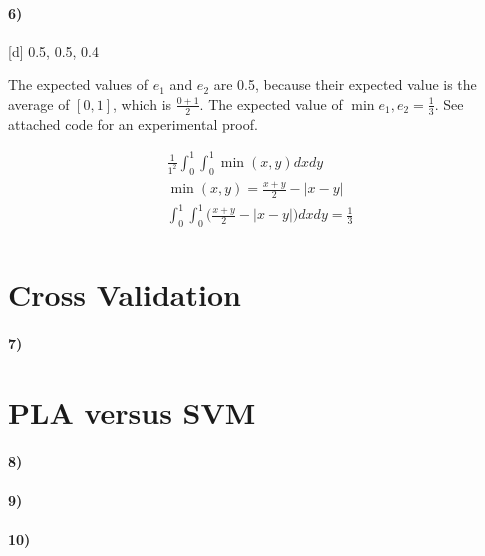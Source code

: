 \documentclass[10pt,letter]{article}
\begin{document}
\paragraph{6)} [d] 0.5, 0.5, 0.4

	The expected values of $e_1$ and $e_2$ are 0.5, because their expected value is the average of $[0,1]$, which is $\frac{0+1}{2}$. The expected value of $\min{e_1, e_2} = \frac{1}{3}$. See attached code for an experimental proof. 

	\begin{align*}
	\frac{1}{1^2} \int_0^1 \int_0^1 \min(x, y) dx dy \\
	\min(x, y) = \frac{x+y}{2} - |x - y| \\
	\int_0^1 \int_0^1 \big( \frac{x+y}{2} - |x - y| \big) dx dy  = \frac{1}{3}\\
	\end{align*}

\section*{Cross Validation}

\paragraph{7)} 

\section*{PLA versus SVM}

\paragraph{8)} 
\paragraph{9)} 
\paragraph{10)} 
\end{document}
